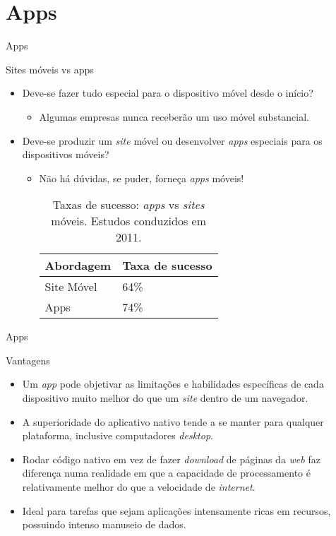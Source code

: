 \section{Apps}

\begin{frame}{Apps}
\begin{block}{Sites móveis vs apps}
  \begin{itemize}
    \item<1-> Deve-se fazer tudo especial para o dispositivo móvel desde o início?
      \begin{itemize}
        \item<2-> Algumas empresas nunca receberão um uso móvel substancial.
      \end{itemize}
    \item<3-> Deve-se produzir um \emph{site} móvel ou desenvolver \emph{apps} especiais para os dispositivos móveis?
      \begin{itemize}
        \item<4-> Não há dúvidas, se puder, forneça \emph{apps} móveis!
          \begin{table}
            \centering
            \begin{tabular}{ll}
              \toprule
              \textbf{Abordagem}                & \textbf{Taxa de sucesso}\\
              \midrule
              Site Móvel     & 64\% \\
              Apps           & 74\% \\
              \bottomrule
            \end{tabular}
            \parbox{0.50\textwidth}{\caption{Taxas de sucesso: \emph{apps} vs \emph{sites} móveis. Estudos conduzidos em 2011.}}
          \end{table}
      \end{itemize}
  \end{itemize}
\end{block}
\end{frame}

\begin{frame}{Apps}
\begin{block}{Vantagens}
  \begin{itemize}
    \item<1-> Um \emph{app} pode objetivar as limitações e habilidades específicas de cada dispositivo muito melhor do que um \emph{site} dentro de um navegador.
    \item<2-> A superioridade do aplicativo nativo tende a se manter para qualquer plataforma, inclusive computadores \emph{desktop}.
    \item<3-> Rodar código nativo em vez de fazer \emph{download} de páginas da \emph{web} faz diferença numa realidade em que a capacidade de processamento é relativamente melhor do que a velocidade de \emph{internet}.
    \item<4-> Ideal para tarefas que sejam aplicações intensamente ricas em recursos, possuindo intenso manuseio de dados.
  \end{itemize}
\end{block}
\end{frame}

